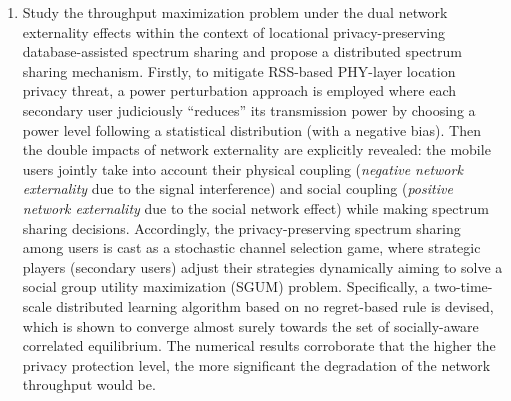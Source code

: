 \begin{englishabstract}
\begin{enumerate}
		
		\item Study the throughput maximization problem under the dual network externality effects within the context of locational privacy-preserving database-assisted spectrum sharing and propose a distributed spectrum sharing mechanism. Firstly, to mitigate RSS-based PHY-layer location privacy threat, a power perturbation approach is employed where each secondary user judiciously ``reduces'' its transmission power by choosing a power level following a statistical distribution (with a negative bias). Then the double impacts of network externality are explicitly revealed: the mobile users jointly take into account their physical coupling (\textsl{negative network externality} due to the signal interference) and social coupling (\textsl{positive network externality} due to the social network effect) while making spectrum sharing decisions. Accordingly, the privacy-preserving spectrum sharing among users is cast as a stochastic channel selection game, where strategic players (secondary users) adjust their strategies dynamically aiming to solve a social group utility maximization (SGUM) problem. Specifically, a two-time-scale distributed learning algorithm based on no regret-based rule is devised, which is shown to converge almost surely towards the set of socially-aware correlated equilibrium. The numerical results corroborate that the higher the privacy protection level, the more significant the degradation of the network throughput would be.
    		

\end{enumerate}
\end{englishabstract}
